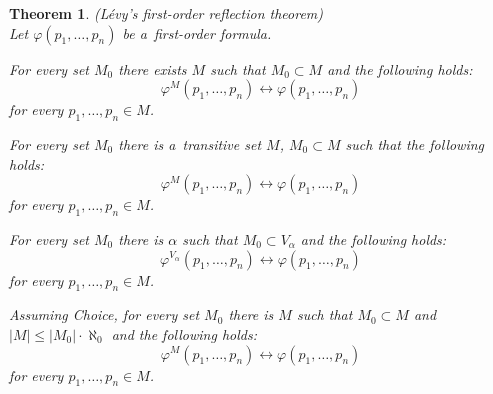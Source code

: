 \documentclass[12pt,a4paper]{article}
\newtheorem{theorem}{Theorem}[section]
\renewcommand{\iff}{\leftrightarrow}
\newcommand{\bce}{\begin{compactenum}}
\newcommand{\ece}{\end{compactenum}}
\begin{document}
\begin{theorem}{(Lévy's first-order reflection theorem)}\label{theorem:first_order_reflection}\\
Let $\varphi(p_1, \ldots, p_n)$ be a~first-order formula.
\bce[(i)]
\item For every set $M_0$ there exists $M$ such that $M_0 \subset M$ and the following holds:
\begin{equation}
\varphi^M(p_1, \ldots, p_n) \iff \varphi(p_1, \ldots, p_n)\label{equation:levy_theorem_i}
\end{equation}
for every $p_1, \ldots, p_n \in M$.

\item For every set $M_0$  there is a~transitive set $M$, $M_0 \subset M$ such that the following holds:
\begin{equation}
\varphi^M(p_1, \ldots, p_n) \iff \varphi(p_1, \ldots, p_n)
\end{equation}
for every $p_1, \ldots, p_n \in M$.

\item For every set $M_0$ there is $\alpha$ such that $M_0 \subset V_{\alpha}$ and the following holds:
\begin{equation}
\varphi^{V_{\alpha}}(p_1, \ldots, p_n) \iff \varphi(p_1, \ldots, p_n)
\end{equation}
for every $p_1, \ldots, p_n \in M$.

\item Assuming \emph{Choice}, for every set $M_0$ there is $M$ such that $M_0 \subset M$ and $|M| \leq |M_0| \cdot \aleph_0$ and the following holds:
\begin{equation}
\varphi^M(p_1, \ldots, p_n) \iff \varphi(p_1, \ldots, p_n)
\end{equation}
for every $p_1, \ldots, p_n \in M$.
\ece
\end{theorem}
\end{document}
